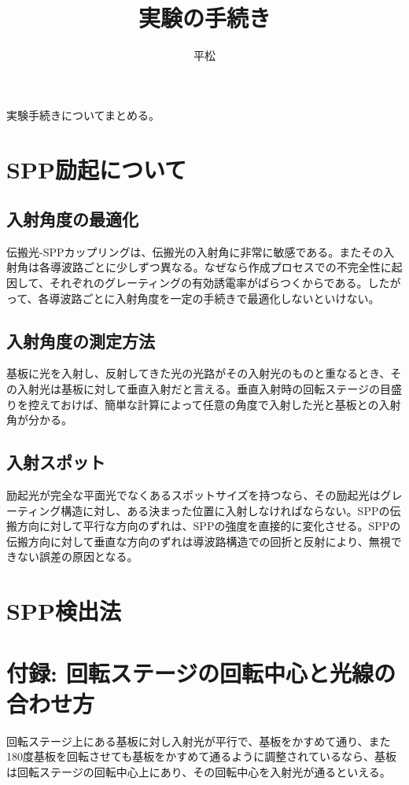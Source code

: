 \documentclass[11pt]{article}
\begin{document}
\title{実験の手続き}
\author{平松}
\maketitle

\abstract
実験手続きについてまとめる。

\section{SPP励起について}
\subsection{入射角度の最適化}
伝搬光-SPPカップリングは、伝搬光の入射角に非常に敏感である。またその入射角は各導波路ごとに少しずつ異なる。なぜなら作成プロセスでの不完全性に起因して、それぞれのグレーティングの有効誘電率がばらつくからである。したがって、各導波路ごとに入射角度を一定の手続きで最適化しないといけない。

\subsection{入射角度の測定方法}
基板に光を入射し、反射してきた光の光路がその入射光のものと重なるとき、その入射光は基板に対して垂直入射だと言える。垂直入射時の回転ステージの目盛りを控えておけば、簡単な計算によって任意の角度で入射した光と基板との入射角が分かる。

\subsection{入射スポット}
励起光が完全な平面光でなくあるスポットサイズを持つなら、その励起光はグレーティング構造に対し、ある決まった位置に入射しなければならない。SPPの伝搬方向に対して平行な方向のずれは、SPPの強度を直接的に変化させる。SPPの伝搬方向に対して垂直な方向のずれは導波路構造での回折と反射により、無視できない誤差の原因となる。

\section{SPP検出法}
\section*{付録: 回転ステージの回転中心と光線の合わせ方}
回転ステージ上にある基板に対し入射光が平行で、基板をかすめて通り、また180度基板を回転させても基板をかすめて通るように調整されているなら、基板は回転ステージの回転中心上にあり、その回転中心を入射光が通るといえる。
\end{document}
